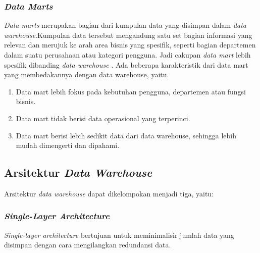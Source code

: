 \subsubsection{\textit{Data Marts}}

\textit{Data marts} merupakan bagian dari kumpulan data yang disimpan dalam \textit{data warehouse}.Kumpulan data tersebut mengandung satu set bagian informasi yang relevan dan merujuk ke arah area bisnis yang spesifik, seperti bagian departemen dalam suatu perusahaan atau kategori pengguna. Jadi cakupan \textit{data mart} lebih spesifik dibanding \textit{data warehouse} \cite{Matteo:2009}. Ada beberapa karakteristik dari data mart yang membedakannya dengan data warehouse, yaitu.\cite{Carlo:2009}
\begin{enumerate}
	\item Data mart lebih fokus pada kebutuhan pengguna, departemen atau fungsi bisnis.
	\item Data mart tidak  berisi data operasional yang terperinci. 
	\item Data mart berisi lebih sedikit data dari data warehouse, sehingga lebih mudah dimengerti dan dipahami.	
\end{enumerate}

\subsection{Arsitektur \textit{Data Warehouse}}
Arsitektur \textit{data warehouse} dapat dikelompokan menjadi tiga, yaitu\cite{Matteo:2009}:

\subsubsection{\textit{Single-Layer Architecture}}
\textit{Single-layer architecture} bertujuan untuk meminimalisir jumlah data yang disimpan dengan cara mengilangkan redundansi data.

